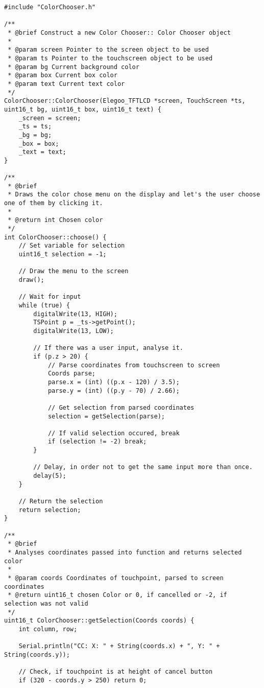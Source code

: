 \documentclass[a4paper, 11pt]{scrartcl}
\begin{document}
\begin{lstlisting}
#include "ColorChooser.h"

/**
 * @brief Construct a new Color Chooser:: Color Chooser object
 * 
 * @param screen Pointer to the screen object to be used
 * @param ts Pointer to the touchscreen object to be used
 * @param bg Current background color
 * @param box Current box color
 * @param text Current text color
 */
ColorChooser::ColorChooser(Elegoo_TFTLCD *screen, TouchScreen *ts, uint16_t bg, uint16_t box, uint16_t text) {
    _screen = screen;
    _ts = ts;
    _bg = bg;
    _box = box;
    _text = text;
}

/**
 * @brief 
 * Draws the color chose menu on the display and let's the user choose one of them by clicking it.
 * 
 * @return int Chosen color
 */
int ColorChooser::choose() {
    // Set variable for selection
    uint16_t selection = -1;

    // Draw the menu to the screen
    draw();

    // Wait for input
    while (true) {
        digitalWrite(13, HIGH);
        TSPoint p = _ts->getPoint();
        digitalWrite(13, LOW);

        // If there was a user input, analyse it.
        if (p.z > 20) {
            // Parse coordinates from touchscreen to screen
            Coords parse;
            parse.x = (int) ((p.x - 120) / 3.5);
            parse.y = (int) ((p.y - 70) / 2.66);

            // Get selection from parsed coordinates
            selection = getSelection(parse);

            // If valid selection occured, break
            if (selection != -2) break;
        }

        // Delay, in order not to get the same input more than once. 
        delay(5);
    }

    // Return the selection
    return selection;
}

/**
 * @brief 
 * Analyses coordinates passed into function and returns selected color
 * 
 * @param coords Coordinates of touchpoint, parsed to screen coordinates
 * @return uint16_t chosen Color or 0, if cancelled or -2, if selection was not valid
 */
uint16_t ColorChooser::getSelection(Coords coords) {
    int column, row;

    Serial.println("CC: X: " + String(coords.x) + ", Y: " + String(coords.y));

    // Check, if touchpoint is at height of cancel button
    if (320 - coords.y > 250) return 0;


\end{lstlisting}
\end{document}
